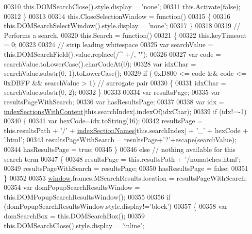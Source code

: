 \begin{DoxyCode}
00310     this.DOMSearchClose().style.display = \textcolor{stringliteral}{'none'};
00311     this.Activate(\textcolor{keyword}{false});
00312   \}
00313 
00314   this.CloseSelectionWindow = \textcolor{keyword}{function}()
00315   \{
00316     this.DOMSearchSelectWindow().style.display = \textcolor{stringliteral}{'none'};
00317   \}
00318 
00319   \textcolor{comment}{// Performs a search.}
00320   this.Search = \textcolor{keyword}{function}()
00321   \{
00322     this.keyTimeout = 0;
00323 
00324     \textcolor{comment}{// strip leading whitespace}
00325     var searchValue = this.DOMSearchField().value.replace(/^ +/, \textcolor{stringliteral}{""});
00326 
00327     var code = searchValue.toLowerCase().charCodeAt(0);
00328     var idxChar = searchValue.substr(0, 1).toLowerCase();
00329     \textcolor{keywordflow}{if} ( 0xD800 <= code && code <= 0xDBFF && searchValue > 1) \textcolor{comment}{// surrogate pair}
00330     \{
00331       idxChar = searchValue.substr(0, 2);
00332     \}
00333 
00334     var resultsPage;
00335     var resultsPageWithSearch;
00336     var hasResultsPage;
00337 
00338     var idx = \hyperlink{search_8js_a6250af3c9b54dee6efc5f55f40c78126}{indexSectionsWithContent}[this.searchIndex].indexOf(idxChar);
00339     \textcolor{keywordflow}{if} (idx!=-1)
00340     \{
00341        var hexCode=idx.toString(16);
00342        resultsPage = this.resultsPath + \textcolor{charliteral}{'/'} + \hyperlink{search_8js_a77149ceed055c6c6ce40973b5bdc19ad}{indexSectionNames}[this.searchIndex] + \textcolor{charliteral}{'\_'} + 
      hexCode + \textcolor{stringliteral}{'.html'};
00343        resultsPageWithSearch = resultsPage+\textcolor{charliteral}{'?'}+escape(searchValue);
00344        hasResultsPage = \textcolor{keyword}{true};
00345     \}
00346     \textcolor{keywordflow}{else} \textcolor{comment}{// nothing available for this search term}
00347     \{
00348        resultsPage = this.resultsPath + \textcolor{stringliteral}{'/nomatches.html'};
00349        resultsPageWithSearch = resultsPage;
00350        hasResultsPage = \textcolor{keyword}{false};
00351     \}
00352 
00353     \hyperlink{jquery_8js_a04a8a2bbfa9c15500892b8e5033d625b}{window}.frames.MSearchResults.location = resultsPageWithSearch;  
00354     var domPopupSearchResultsWindow = this.DOMPopupSearchResultsWindow();
00355 
00356     \textcolor{keywordflow}{if} (domPopupSearchResultsWindow.style.display!=\textcolor{stringliteral}{'block'})
00357     \{
00358        var domSearchBox = this.DOMSearchBox();
00359        this.DOMSearchClose().style.display = \textcolor{stringliteral}{'inline'};

\end{DoxyCode}
